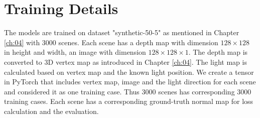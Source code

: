 \documentclass[border=15pt, multi, tikz]{article}
\begin{document}
\section{Training Details}

The models are trained on dataset "synthetic-50-5" as mentioned in Chapter \ref{ch:04} with 3000 scenes. Each scene has a depth map with dimension $ 128\times 128 $ in height and width, an image with dimension $ 128\times 128 \times 1 $.  The depth map is converted to 3D vertex map as introduced in Chapter \ref{ch:04}. The light map is calculated based on vertex map and the known light position. We create a tensor in PyTorch that includes vertex map, image and the light direction for each scene and considered it as one training case. Thus 3000 scenes has corresponding 3000 training cases. Each scene has a corresponding ground-truth normal map for loss calculation and the evaluation. 
\end{document}
